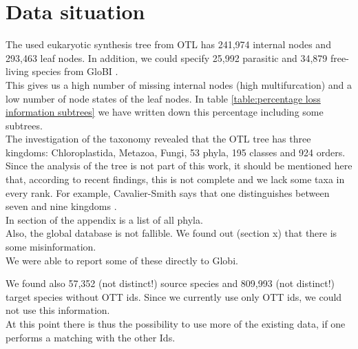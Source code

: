 
  \section{Data situation} \label{sec:discussion - data situation}
    The used eukaryotic synthesis tree from OTL \cite{Hinchliff2015} has 241,974 internal nodes and 
      293,463 leaf nodes. In addition, we could specify 25,992 parasitic and 34,879 free-living 
      species from GloBI \cite{Poelen2014}. \\
    This gives us a high number of missing internal nodes (high multifurcation) and a low number of 
      node states of the leaf nodes. In table \ref{table:percentage loss information subtrees} we have 
      written down this percentage including some subtrees. \\

    The investigation of the taxonomy revealed that the OTL tree has three kingdoms: Chloroplastida, 
      Metazoa, Fungi, 53 phyla, 195 classes and 924 orders. \\
    Since the analysis of the tree is not part of this work, it should be mentioned here that, 
      according to recent findings, this is not complete and we lack some taxa in every rank. For 
      example, Cavalier-Smith says that one distinguishes between seven and nine kingdoms 
      \cite{CavalierSmith1981}. \\
    In section \pageref{subsec:listPhyla} of the appendix is a list of all phyla. \\

    Also, the global database is not fallible. We found out (section x) that there is some 
      misinformation. \\
    We were able to report some of these directly to Globi.

    We found also 57,352 (not distinct!) source species and 809,993 (not distinct!) target species 
      without OTT ids. Since we currently use only OTT ids, we could not use this information. \\
    At this point there is thus the possibility to use more of the existing data, if one performs a 
      matching with the other Ids.


